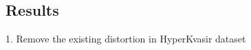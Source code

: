 \documentclass{libs/ufc_format}
\begin{document}
\subsection{Results}
\begin{frame}{1. Remove the existing distortion in HyperKvasir dataset}







\end{frame}
\end{document}
